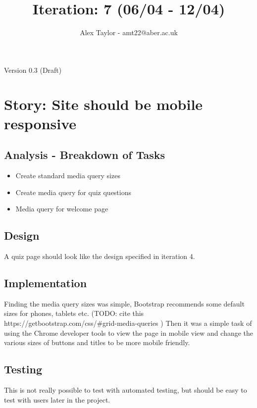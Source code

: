 \documentclass{article}
\title{Iteration: 7 (06/04 - 12/04)}
\author{Alex Taylor - amt22@aber.ac.uk}
\begin{document}
\maketitle
\begin{center}
	Version 0.3 (Draft)
\end{center}
\tableofcontents
\thispagestyle{empty}
\newpage

\section{Story: Site should be mobile responsive}
\subsection{Analysis - Breakdown of Tasks}
\begin{itemize}
	\item Create standard media query sizes
	\item Create media query for quiz questions
	\item Media query for welcome page
\end{itemize}
\subsection{Design}
A quiz page should look like the design specified in iteration 4.
\subsection{Implementation}
Finding the media query sizes was simple, Bootstrap recommends some default sizes for phones, tablets etc. (TODO: cite this https://getbootstrap.com/css/\#grid-media-queries ) Then it was a simple task of using the Chrome developer tools to view the page in mobile view and change the various sizes of buttons and titles to be more mobile friendly.
\subsection{Testing}
This is not really possible to test with automated testing, but should be easy to test with users later in the project.
\newpage

%
%
\end{document}
